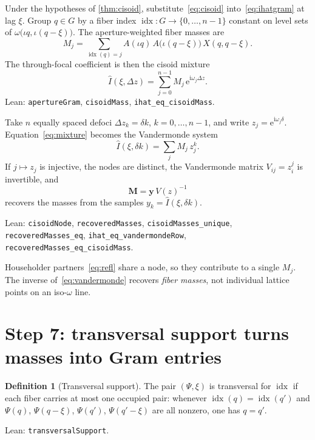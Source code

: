 \documentclass[11pt,a4paper]{article}
\theoremstyle{definition}
\newtheorem{definition}[theorem]{Definition}
\theoremstyle{remark}
\newcommand{\ee}{\mathrm{e}}
\newcommand{\ii}{\mathrm{i}}
\newcommand{\Dz}{\Delta z}
\begin{document}
Under the hypotheses of \cref{thm:cisoid}, substitute~\eqref{eq:cisoid}
into~\eqref{eq:ihatgram} at lag $\xi$.
Group $q\in G$ by a fiber index $\operatorname{idx}:G\to\{0,\dots,n-1\}$
constant on level sets of
$\omega\bigl(\iota q,\iota(q-\xi)\bigr)$.
The aperture-weighted fiber masses are
\begin{equation}
\label{eq:Mj}
M_j
=\sum_{\operatorname{idx}(q)=j}
A(\iota q)\,A\bigl(\iota(q-\xi)\bigr)\,X(q,q-\xi).
\end{equation}
The through-focal coefficient is then the cisoid mixture
\begin{equation}
\label{eq:mixture}
\hat I(\xi,\Dz)
=\sum_{j=0}^{n-1}
M_j\,\ee^{\ii\omega_j\Dz}.
\end{equation}
Lean: \texttt{apertureGram}, \texttt{cisoidMass},
\texttt{ihat\_eq\_cisoidMass}.

Take $n$ equally spaced defoci $\Dz_k=\delta k$, $k=0,\dots,n-1$,
and write $z_j=\ee^{\ii\omega_j\delta}$.
Equation~\eqref{eq:mixture} becomes the Vandermonde system
\begin{equation}
\label{eq:vandermonde}
\hat I(\xi,\delta k)
=\sum_{j}M_j\,z_j^k.
\end{equation}
If $j\mapsto z_j$ is injective, the nodes are distinct, the
Vandermonde matrix $V_{ij}=z_i^{j}$ is invertible, and
\begin{equation}
\label{eq:recM}
\mathbf{M}
=\mathbf{y}\,V(z)^{-1}
\end{equation}
recovers the masses from the samples
$y_k=\hat I(\xi,\delta k)$.
{\raggedright
Lean: \texttt{cisoidNode}, \texttt{recoveredMasses},
\texttt{cisoidMasses\_unique}, \texttt{recoveredMasses\_eq},
\texttt{ihat\_eq\_vandermondeRow},
\texttt{recoveredMasses\_eq\_cisoidMass}.
\par}

Householder partners~\eqref{eq:refl} share a node, so they contribute
to a single $M_j$.
The inverse of~\eqref{eq:vandermonde} recovers \emph{fiber masses},
not individual lattice points on an iso-$\omega$ line.

\section{Step 7: transversal support turns masses into Gram entries}
\label{sec:transversal}

\begin{definition}[Transversal support]
\label{def:trans}
The pair $(\Psi,\xi)$ is transversal for $\operatorname{idx}$ if each
fiber carries at most one occupied pair:
whenever $\operatorname{idx}(q)=\operatorname{idx}(q')$ and
$\Psi(q)$, $\Psi(q-\xi)$, $\Psi(q')$, $\Psi(q'-\xi)$ are all nonzero,
one has $q=q'$.
\end{definition}
Lean: \texttt{transversalSupport}.
\end{document}

